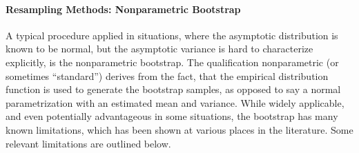\documentclass[12pt,a4paper,english]{article} %
\numberwithin{equation}{section}
\theoremstyle{definition}
\theoremstyle{remark}
\theoremstyle{plain}
\begin{document}



\paragraph{Resampling Methods: Nonparametric Bootstrap}

A typical procedure applied in situations, where the asymptotic distribution is known to be normal, but the asymptotic variance is hard to characterize explicitly, is the nonparametric bootstrap.
The qualification nonparametric (or sometimes ``standard'') derives from the fact, that the empirical distribution function is used to generate the bootstrap samples, as opposed to say a normal parametrization with an estimated mean and variance.
While widely applicable, and even potentially advantageous in some situations, the bootstrap has many known limitations, which has been shown at various places in the literature.
Some relevant limitations are outlined below.
\end{document}
